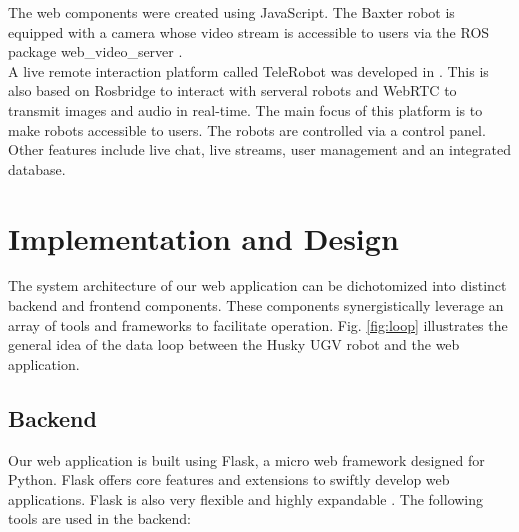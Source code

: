 \documentclass[conference]{IEEEtran}
\begin{document}
The web components were created using JavaScript. The Baxter robot is equipped with a camera whose video stream is accessible to users via the ROS package web\_video\_server \cite{webvideoserver}.\\
A live remote interaction platform called TeleRobot was developed in \cite{wang}. This is also based on Rosbridge to interact with serveral robots and WebRTC to transmit images and audio in real-time. The main focus of this platform is to make robots accessible to users. The robots are controlled via a control panel. Other features include live chat, live streams, user management and an integrated database.

\section{Implementation and Design}
The system architecture of our web application can be dichotomized into distinct backend and frontend components. These components synergistically leverage an array of tools and frameworks to facilitate operation.
Fig. \ref{fig:loop} illustrates the general idea of the data loop between the Husky UGV robot and the web application.

\subsection{Backend}
Our web application is built using Flask, a micro web framework designed for Python.
Flask offers core features and extensions to swiftly develop web applications. Flask is also very flexible and highly expandable \cite{flasksqlite}. The following tools are used in the backend:
\end{document}
